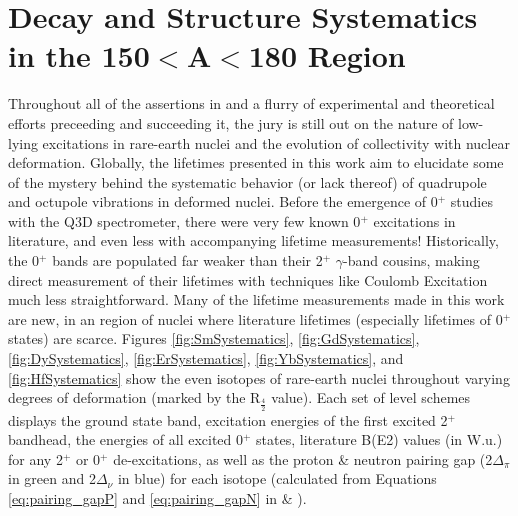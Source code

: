 \section{Decay and Structure Systematics in the 150$<$A$<$180 Region}\label{sec:Structure_systematics}
Throughout all of the assertions in \cite{RevModPhys.83.1467} and a flurry of experimental and theoretical efforts preceeding and succeeding it, the jury is still out on the nature of low-lying excitations in rare-earth nuclei and the evolution of collectivity with nuclear deformation. Globally, the lifetimes presented in this work aim to elucidate some of the mystery behind the systematic behavior (or lack thereof) of quadrupole and octupole vibrations in deformed nuclei. Before the emergence of 0$^+$ studies with the Q3D spectrometer, there were very few known 0$^+$ excitations in literature, and even less with accompanying lifetime measurements! Historically, the 0$^+$ bands are populated far weaker than their 2$^+$ $\gamma$-band cousins, making direct measurement of their lifetimes with techniques like Coulomb Excitation much less straightforward. Many of the lifetime measurements made in this work are new, in an region of nuclei where literature lifetimes (especially lifetimes of 0$^+$ states) are scarce. Figures \ref{fig:SmSystematics}, \ref{fig:GdSystematics}, \ref{fig:DySystematics}, \ref{fig:ErSystematics}, \ref{fig:YbSystematics}, and \ref{fig:HfSystematics} show the even isotopes of rare-earth nuclei throughout varying degrees of deformation (marked by the R$_{\frac{4}{2}}$ value). Each set of level schemes displays the ground state band, excitation energies of the first excited 2$^+$ bandhead, the energies of all excited 0$^+$ states, literature B(E2) values (in W.u.) for any 2$^+$ or 0$^+$ de-excitations, as well as the proton \& neutron pairing gap (2$\Delta_\pi$ in green and 2$\Delta_\nu$ in blue) for each isotope (calculated from Equations \ref{eq:pairing_gapP} and \ref{eq:pairing_gapN} in \cite{Bender_pairing2000} \& \cite{MANG_pairing1965353}).


